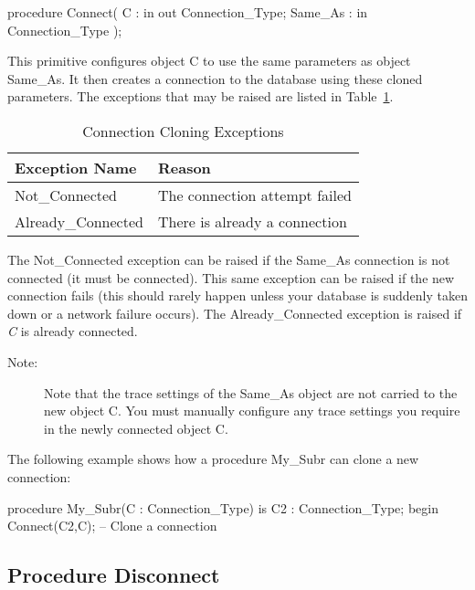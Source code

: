 \documentclass[english,letterpaper]{book}
\begin{document}
\begin{Code}
procedure Connect(
   C :       in out Connection_Type;
   Same_As : in     Connection_Type
);
\end{Code}

This primitive configures object C to use the same parameters as object
Same\_As. It then creates a connection to the database using these cloned
parameters. The exceptions that may be raised are listed in Table~\ref{t:cclonx}.

\begin{table}
   \begin{center}
      \begin{tabular}{ll}
         Exception Name       &  Reason\\
         \hline 
         Not\_Connected       &  The connection attempt failed\\
         Already\_Connected   &  There is already a connection\\
      \end{tabular}
   \end{center}
   \caption{Connection Cloning Exceptions}\label{t:cclonx}
\end{table}

The Not\_Connected exception can be raised if the Same\_As connection
is not connected (it must be connected). This same exception can be
raised if the new connection fails (this should rarely happen unless
your database is suddenly taken down or a network failure occurs).
The Already\_Connected exception is raised if \emph{C} is already
connected.

\begin{description}
   \item[Note:] Note that the trace settings of the Same\_As object are not
      carried to the new object C. You must manually configure any trace
      settings you require in the newly connected object C.
\end{description}

The following example shows how a procedure My\_Subr can clone
a new connection:

\begin{Example}
procedure My_Subr(C : Connection_Type) is
   C2 : Connection_Type;
begin
   Connect(C2,C); -- Clone a connection
\end{Example}

\subsection{Procedure Disconnect}
\end{document}
